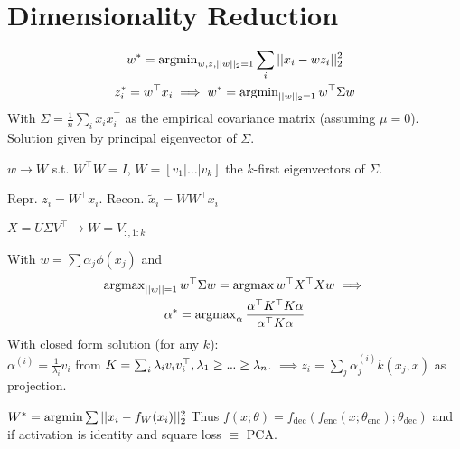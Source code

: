 \section{Dimensionality Reduction} \vspace{-11pt}
\begin{gather*}
  w^* = \operatorname{argmin}_{w, z, ||w||_2 = 1} \sum_i ||x_i - w z_i||_2^2 \\
  z_i^* = w^\top x_i \implies w^* = \operatorname{argmin}_{||w||_2 = 1} w^\top \Sigma w
\end{gather*}
With \(\Sigma = \frac{1}{n} \sum_i x_i x_i^\top\) as the empirical covariance matrix (assuming \(\mu = 0\)). Solution given by principal eigenvector of \(\Sigma\).

\begin{definition}
  \(w \to W\) s.t. \(W^\top W = I\), \(W = [v_1 | \ldots | v_k]\) the \(k\)-first eigenvectors of \(\Sigma\).

  Repr. \(z_i = W^\top x_i\). Recon. \(\tilde{x}_i = W W^\top x_i\)
\end{definition}

\begin{definition}
  \(X = U \Sigma V^\top \to W = V_{:, 1:k}\)
\end{definition}

\begin{definition}
  With \(w = \sum \alpha_j \phi(x_j)\) and
  \begin{gather*}
    \operatorname{argmax}_{||w|| = 1} w^\top \Sigma w = \operatorname{argmax} w^\top X^\top X w \implies \\
    \alpha^* = \operatorname{argmax}_\alpha \frac{\alpha^\top K^\top K \alpha}{\alpha^\top K \alpha}
  \end{gather*} 
  With closed form solution (for any \(k\)): \\
  \(\alpha^{(i)} = \frac{1}{\lambda_i} v_i\) from \(K = \sum_i \lambda_i v_i v_i^\top, \lambda_1 \geq \sdots \geq \lambda_n\).
  \(\implies z_i = \sum_j \alpha_j^{(i)} k(x_j, x)\) as projection.
\end{definition}

\begin{definition}[Autoencoder]
  \(W^* = \operatorname{argmin} \sum ||x_i - f_W(x_i)||_2^2\)
  Thus \(f(x; \theta) = f_{\text{dec}}(f_{\text{enc}}(x ; \theta_{\text{enc}}); \theta_{\text{dec}})\) and if activation is identity and square loss \(\equiv\) PCA.
\end{definition}